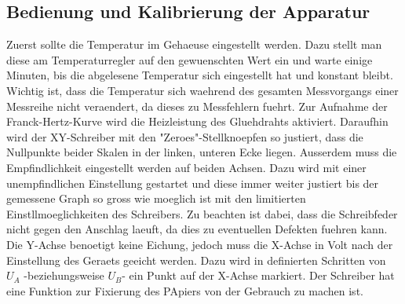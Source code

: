 \documentclass[titlepage=firstcover, captions=tableheading]{scrartcl}
\begin{document}
\subsection{Bedienung und Kalibrierung der Apparatur}
Zuerst sollte die Temperatur im Gehaeuse eingestellt werden. Dazu stellt man diese am Temperaturregler auf den gewuenschten Wert ein und warte einige Minuten, bis die abgelesene Temperatur sich eingestellt hat und konstant bleibt. Wichtig ist, dass die Temperatur sich waehrend des gesamten Messvorgangs einer Messreihe nicht veraendert, da dieses zu Messfehlern fuehrt. Zur Aufnahme der Franck-Hertz-Kurve wird die Heizleistung des Gluehdrahts aktiviert. Daraufhin wird der XY-Schreiber mit den "Zeroes"-Stellknoepfen so justiert, dass die Nullpunkte beider Skalen in der linken, unteren Ecke liegen. Ausserdem muss die Empfindlichkeit eingestellt werden auf beiden Achsen. Dazu wird mit einer unempfindlichen Einstellung gestartet und diese immer weiter justiert bis der gemessene Graph so gross wie moeglich ist mit den limitierten Einstllmoeglichkeiten des Schreibers. Zu beachten ist dabei, dass die Schreibfeder nicht gegen den Anschlag laeuft, da dies zu eventuellen Defekten fuehren kann. Die Y-Achse benoetigt keine Eichung, jedoch muss die X-Achse in Volt nach der Einstellung des Geraets geeicht werden. Dazu wird in definierten Schritten von $U_A$ -beziehungsweise $U_B$- ein Punkt auf der X-Achse markiert. Der Schreiber hat eine Funktion zur Fixierung des PApiers von der Gebrauch zu machen ist.
\end{document}
